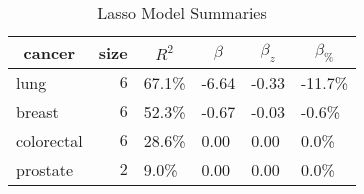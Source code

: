 %
\begin{table}[!tbp]
\caption{Lasso Model Summaries\label{tab:lasso}} 
\begin{center}
\begin{tabular}{lrllll}
\hline\hline
\multicolumn{1}{c}{cancer}&\multicolumn{1}{c}{size}&\multicolumn{1}{c}{$R^2$}&\multicolumn{1}{c}{$\beta$}&\multicolumn{1}{c}{$\beta_z$}&\multicolumn{1}{c}{$\beta_{\%}$}\tabularnewline
\hline
lung&$6$&67.1\%&-6.64&-0.33&-11.7\%\tabularnewline
breast&$6$&52.3\%&-0.67&-0.03&-0.6\%\tabularnewline
colorectal&$6$&28.6\%&0.00&0.00&0.0\%\tabularnewline
prostate&$2$&9.0\%&0.00&0.00&0.0\%\tabularnewline
\hline
\end{tabular}
\end{center}
\end{table}

